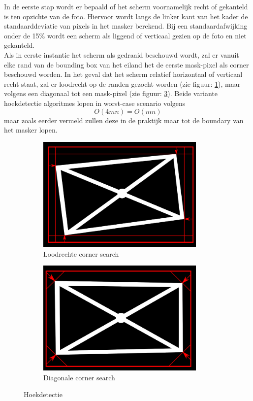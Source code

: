 In de eerste stap wordt er bepaald of het scherm voornamelijk recht of gekanteld is ten opzichte van de foto. Hiervoor wordt langs de linker kant van het kader de standaarddeviatie van pixels in het masker berekend. Bij een standaardafwijking onder de 15\% wordt een scherm als liggend of verticaal gezien op de foto en niet gekanteld.\\
Als in eerste instantie het scherm als gedraaid beschouwd wordt, zal er vanuit elke rand van de bounding box van het eiland het de eerste mask-pixel als corner beschouwd worden. In het geval dat het scherm relatief horizontaal of verticaal recht staat, zal er loodrecht op de randen gezocht worden (zie figuur: \ref{fig:perp search}), maar volgens een diagonaal tot een mask-pixel (zie figuur: \ref{fig:diag search}). Beide variante hoekdetectie algoritmes lopen in worst-case scenario volgens
\[O(4mn)=O(mn)\]
maar zoals eerder vermeld zullen deze in de praktijk maar tot de boundary van het masker lopen.

\begin{figure}[H] 
\centering
\begin{subfigure}{0.5\textwidth}
\centering
\includegraphics[width=0.9\textwidth]{img/perpSearch.png}
\caption{Loodrechte corner search}
\label{fig:perp search}
\end{subfigure}%
\begin{subfigure}{0.5\textwidth}
\centering
\includegraphics[width=0.9\textwidth]{img/diagSearch.png}
\caption{Diagonale corner search}
\label{fig:diag search}
\end{subfigure}
\caption{Hoekdetectie}
\end{figure}

